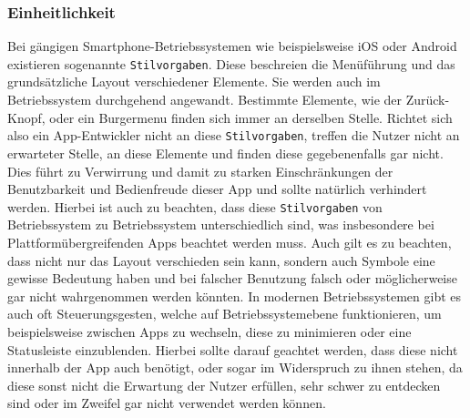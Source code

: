 \documentclass[a4paper, ngerman, 12pt, usenames, dvipsnames]{article}
\begin{document}
\subsubsection{Einheitlichkeit}
Bei gängigen Smartphone-Betriebssystemen wie beispielsweise iOS oder Android existieren sogenannte \texttt{Stilvorgaben}. Diese beschreien die Menüführung und das grundsätzliche Layout verschiedener Elemente. Sie werden auch im Betriebssystem durchgehend angewandt. Bestimmte Elemente, wie der Zurück-Knopf, oder ein Burgermenu finden sich immer an derselben Stelle. Richtet sich also ein App-Entwickler nicht an diese \texttt{Stilvorgaben}, treffen die Nutzer nicht an erwarteter Stelle, an diese Elemente und finden diese gegebenenfalls gar nicht. Dies führt zu Verwirrung und damit zu starken Einschränkungen der Benutzbarkeit und Bedienfreude dieser App und sollte natürlich verhindert werden. Hierbei ist auch zu beachten, dass diese \texttt{Stilvorgaben} von Betriebssystem zu Betriebssystem unterschiedlich sind, was insbesondere bei Plattformübergreifenden Apps beachtet werden muss. Auch gilt es zu beachten, dass nicht nur das Layout verschieden sein kann, sondern auch Symbole eine gewisse Bedeutung haben und bei falscher Benutzung falsch oder möglicherweise gar nicht wahrgenommen werden könnten. In modernen Betriebssystemen gibt es auch oft Steuerungsgesten, welche auf Betriebssystemebene funktionieren, um beispielsweise zwischen Apps zu wechseln, diese zu minimieren oder eine Statusleiste einzublenden. Hierbei sollte darauf geachtet werden, dass diese nicht innerhalb der App auch benötigt, oder sogar im Widerspruch zu ihnen stehen, da diese sonst nicht die Erwartung der Nutzer erfüllen, sehr schwer zu entdecken sind oder im Zweifel gar nicht verwendet werden können.  
\end{document}
